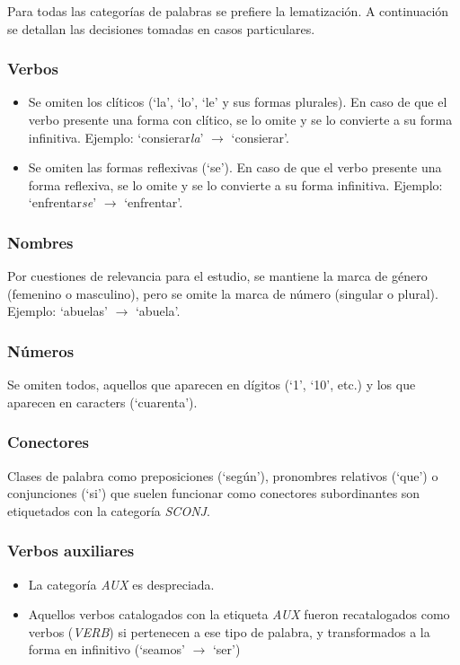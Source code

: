 Para todas las categorías de palabras se prefiere la lematización. A continuación
se detallan las decisiones tomadas en casos particulares.

\subsubsection{Verbos}
\begin{itemize}
    \item Se omiten los clíticos (`la', `lo', `le' y sus formas plurales). En caso de
    que el verbo presente una forma con clítico, se lo omite y se lo convierte a su
    forma infinitiva. Ejemplo: `consierar\textit{la}' $\rightarrow$ `consierar'.
    \item Se omiten las formas reflexivas (`se'). En caso de que el verbo presente
    una forma reflexiva, se lo omite y se lo convierte a su forma infinitiva.
    Ejemplo: `enfrentar\textit{se}' $\rightarrow$ `enfrentar'.
\end{itemize}

\subsubsection{Nombres}
Por cuestiones de relevancia para el estudio, se mantiene la marca de género (femenino
o masculino), pero se omite la marca de número (singular o plural). Ejemplo: `abuelas'
$\rightarrow$ `abuela'.

\subsubsection{Números}
Se omiten todos, aquellos que aparecen en dígitos (`1', `10', etc.) y los que aparecen
en caracters (`cuarenta').

\subsubsection{Conectores}
Clases de palabra como preposiciones (`según'), pronombres relativos (`que') o
conjunciones (`si') que suelen funcionar como conectores subordinantes son
etiquetados con la categoría \textit{SCONJ}.

\subsubsection{Verbos auxiliares}
\begin{itemize}
    \item La categoría \textit{AUX} es despreciada.
    \item Aquellos verbos catalogados con la etiqueta \textit{AUX} fueron
    recatalogados como verbos (\textit{VERB}) si pertenecen a ese tipo de
    palabra, y transformados a la forma en infinitivo (`seamos' $\rightarrow$ `ser')
\end{itemize}

%
